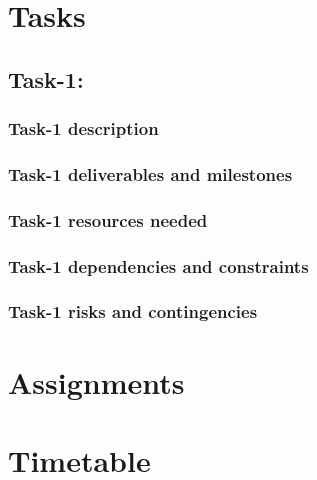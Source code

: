 \documentclass{article}[12pt]
\begin{document}
\section{Tasks} \label{s:intro}

\subsection{Task-1: } \label{s:intro}
\subsubsection{Task-1 description} \label{s:intro}
\subsubsection{Task-1 deliverables and milestones} \label{s:intro}
\subsubsection{Task-1 resources needed} \label{s:intro}
\subsubsection{Task-1 dependencies and constraints} \label{s:intro}
\subsubsection{Task-1 risks and contingencies} \label{s:intro}

\section{Assignments} \label{s:intro}
\section{Timetable} \label{s:intro}
\end{document}
